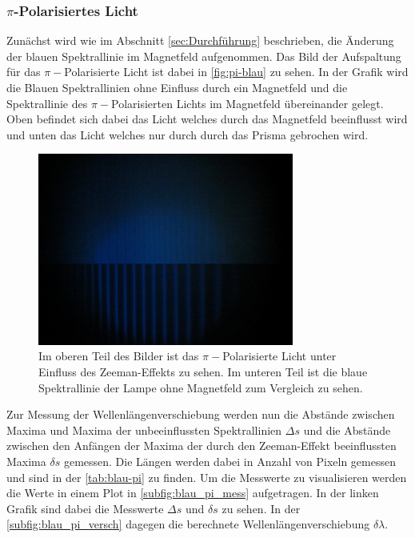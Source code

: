 \subsubsection{\boldmath \texorpdfstring{$\pi$}{pi}-Polarisiertes Licht}
Zunächst wird wie im Abschnitt \ref{sec:Durchführung} beschrieben, die Änderung der blauen Spektrallinie im Magnetfeld aufgenommen.
Das Bild der Aufspaltung für das $\pi -$Polarisierte Licht ist dabei in \autoref{fig:pi-blau} zu sehen.
In der Grafik wird die Blauen Spektrallinien ohne Einfluss durch ein Magnetfeld und die Spektrallinie des $\pi -$Polarisierten Lichts im Magnetfeld übereinander gelegt.
Oben befindet sich dabei das Licht welches durch das Magnetfeld beeinflusst wird und unten das Licht welches nur durch durch das Prisma gebrochen wird.
\begin{figure}
    \centering
    \includegraphics[width=0.75\textwidth]{content/data/Blau_0_pi_uebernander.JPG}
    \caption{Im oberen Teil des Bilder ist das $\pi -$Polarisierte Licht unter Einfluss des Zeeman-Effekts zu sehen. Im unteren Teil ist die blaue Spektrallinie der Lampe ohne Magnetfeld zum Vergleich zu sehen.}
    \label{fig:pi-blau}
\end{figure}
Zur Messung der Wellenlängenverschiebung werden nun die Abstände zwischen Maxima und Maxima der unbeeinflussten Spektrallinien $\Delta s$
und die Abstände zwischen den Anfängen der Maxima der durch den Zeeman-Effekt beeinflussten Maxima $\delta s$ gemessen.
Die Längen werden dabei in Anzahl von Pixeln gemessen und sind in der \autoref{tab:blau-pi} zu finden.
Um die Messwerte zu visualisieren werden die Werte in einem Plot in \autoref{subfig:blau_pi_mess} aufgetragen.
In der linken Grafik sind dabei die Messwerte $\Delta s$ und $\delta s$ zu sehen.
In der \autoref{subfig:blau_pi_versch} dagegen die berechnete Wellenlängenverschiebung $\delta \lambda$.

